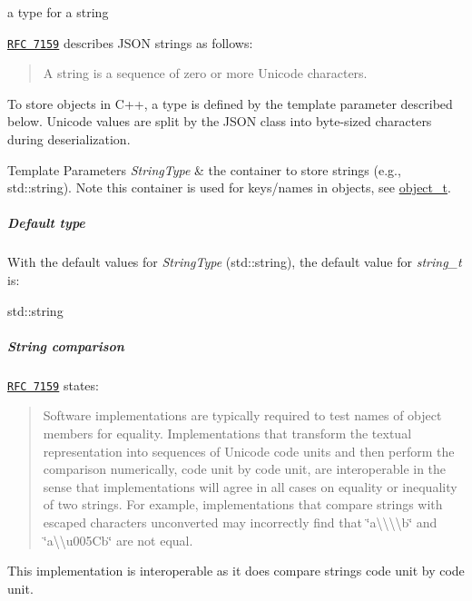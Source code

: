 a type for a string 

\href{http://rfc7159.net/rfc7159}{\tt R\-F\-C 7159} describes J\-S\-O\-N strings as follows\-: \begin{quotation}
A string is a sequence of zero or more Unicode characters.

\end{quotation}


To store objects in C++, a type is defined by the template parameter described below. Unicode values are split by the J\-S\-O\-N class into byte-\/sized characters during deserialization.


\begin{DoxyTemplParams}{Template Parameters}
{\em String\-Type} & the container to store strings (e.\-g., {\ttfamily std\-::string}). Note this container is used for keys/names in objects, see \hyperlink{classnlohmann_1_1basic__json_a0ac9894c9de8dc551cf2e5f1c605537f}{object\-\_\-t}.\\
\hline
\end{DoxyTemplParams}
\subparagraph*{Default type}

With the default values for {\itshape String\-Type} ({\ttfamily std\-::string}), the default value for {\itshape string\-\_\-t} is\-:


\begin{DoxyCode}
std::string
\end{DoxyCode}


\subparagraph*{String comparison}

\href{http://rfc7159.net/rfc7159}{\tt R\-F\-C 7159} states\-: \begin{quotation}
Software implementations are typically required to test names of object members for equality. Implementations that transform the textual representation into sequences of Unicode code units and then perform the comparison numerically, code unit by code unit, are interoperable in the sense that implementations will agree in all cases on equality or inequality of two strings. For example, implementations that compare strings with escaped characters unconverted may incorrectly find that {\ttfamily \char`\"{}a\textbackslash{}\textbackslash{}\textbackslash{}\textbackslash{}b\char`\"{}} and {\ttfamily \char`\"{}a\textbackslash{}\textbackslash{}u005\-Cb\char`\"{}} are not equal.

\end{quotation}


This implementation is interoperable as it does compare strings code unit by code unit.

